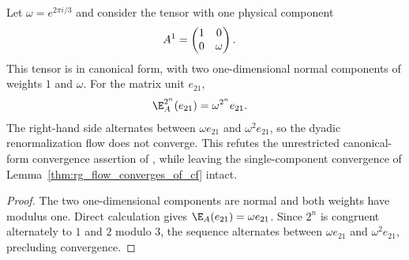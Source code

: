 \begin{lemma}
    \label{thm:cpsv_canonical_form_flow_phase_obstruction}
    \leanok
    Let $\omega=e^{2\pi i/3}$ and consider the tensor with one physical
    component
    \begin{align}
        A^1 & =
        \begin{pmatrix}
            1 & 0      \\
            0 & \omega
        \end{pmatrix}.
        \notag
    \end{align}
    This tensor is in canonical form, with two one-dimensional normal
    components of weights $1$ and $\omega$. For the matrix unit $e_{21}$,
    \begin{align}
        \E_A^{2^n}(e_{21})
         & =\omega^{2^n}e_{21}.
        \notag
    \end{align}
    The right-hand side alternates between $\omega e_{21}$ and
    $\omega^2 e_{21}$, so the dyadic renormalization flow does not converge.
    This refutes the unrestricted canonical-form convergence assertion of
    \cite[lines~417 and 1211--1244]{Cirac2016MPDO_arXiv}, while leaving the
    single-component convergence of Lemma~\ref{thm:rg_flow_converges_of_cf}
    intact.
\end{lemma}
\begin{proof}
    \leanok
    The two one-dimensional components are normal and both weights have
    modulus one. Direct calculation gives $\E_A(e_{21})=\omega e_{21}$. Since
    $2^n$ is congruent alternately to $1$ and $2$ modulo $3$, the sequence
    alternates between $\omega e_{21}$ and $\omega^2 e_{21}$, precluding
    convergence.
\end{proof}

